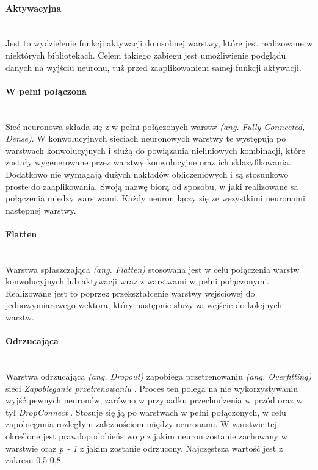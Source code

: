 \paragraph{Aktywacyjna} \mbox{}\\
Jest to wydzielenie funkcji aktywacji do osobnej warstwy, które jest realizowane
w niektórych bibliotekach. Celem takiego zabiegu jest umożliwienie podglądu danych
na wyjściu neuronu, tuż przed zaaplikowaniem samej funkcji aktywacji.

\paragraph{W pełni połączona} \mbox{}\\
Sieć neuronowa składa się z w pełni połączonych warstw \textit{(ang. Fully Connected, Dense)}.
W konwolucyjnych sieciach neuronowych warstwy te występują po warstwach konwolucyjnych
i służą do powiązania nieliniowych kombinacji, które zostały wygenerowane przez
warstwy konwolucyjne oraz ich sklasyfikowania. Dodatkowo nie wymagają dużych nakładów
obliczeniowych i są stosunkowo proste do zaaplikowania. Swoją nazwę biorą od sposobu, w jaki
realizowane sa połączenia między warstwami. Każdy neuron łączy się ze wszystkimi neuronami
następnej warstwy.

\paragraph{Flatten} \mbox{}\\
Warstwa spłaszczająca \textit{(ang. Flatten)} stosowana jest w celu połączenia warstw
konwolucyjnych lub aktywacji wraz z warstwami w pełni połączonymi. Realizowane jest
to poprzez przekształcenie warstwy wejściowej do jednowymiarowego wektora, który następnie
służy za wejście do kolejnych warstw.

\paragraph{Odrzucająca} \mbox{}\\
Warstwa odrzucająca \textit{(ang. Dropout)} zapobiega przetrenowaniu \textit{(ang. Overfitting)}
sieci \textit{Zapobieganie przetrenowaniu} \cite{DropoutPreventOverfit}.
Proces ten polega na nie wykorzystywaniu wyjść pewnych neuronów, zarówno
w przypadku przechodzenia w przód oraz w tył \textit{DropConnect} \cite{DropConnect}. Stosuje się ją po warstwach w pełni
połączonych, w celu zapobiegania rozległym zależnościom między neuronami. W warstwie
tej określone jest prawdopodobieństwo \textit{p} z jakim neuron zostanie zachowany
w warstwie oraz \textit{p - 1} z jakim zostanie odrzucony. Najczęstsza wartość jest
z zakresu 0,5-0,8.

